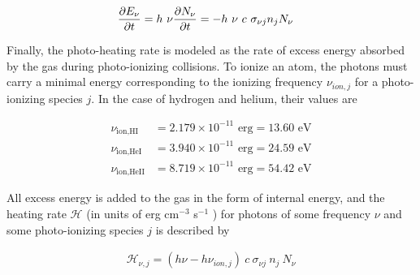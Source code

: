 \begin{align*}
\frac{\partial E_\nu}{\partial t} &= h \ \nu \frac{\partial N_\nu}{\partial t}  = -h\ \nu \ c \ \sigma_{\nu j} n_j N_\nu
\end{align*}



Finally, the photo-heating rate is modeled as the rate of excess energy absorbed by the gas during
photo-ionizing collisions. To ionize an atom, the photons must carry a minimal energy corresponding
to the ionizing frequency  $\nu_{ion,j}$ for a photo-ionizing species $j$. In the case of hydrogen
and helium, their values are

\begin{align}
    \nu_{\text{ion,HI}} &= 2.179 \times 10^{-11} \text{ erg} = 13.60 \text{ eV} \label{eq:nuIonHI}\\
    \nu_{\text{ion,HeI}} &= 3.940 \times 10^{-11} \text{ erg} = 24.59 \text{ eV}
\label{eq:nuIonHeI}\\
    \nu_{\text{ion,HeII}} &= 8.719 \times 10^{-11} \text{ erg} = 54.42 \text{ eV}
\label{eq:nuIonHeII}
\end{align}

All excess energy is added to the gas in the form of internal energy, and the heating rate
$\mathcal{H}$ (in units of erg cm$^{-3}$ s$^{-1}$ ) for photons of some frequency $\nu$ and some
photo-ionizing species $j$ is described by

\begin{align*}
\mathcal{H}_{\nu, j} = (h \nu - h \nu_{ion,j}) \ c \ \sigma_{\nu j} \ n_j \ N_\nu
\end{align*}


